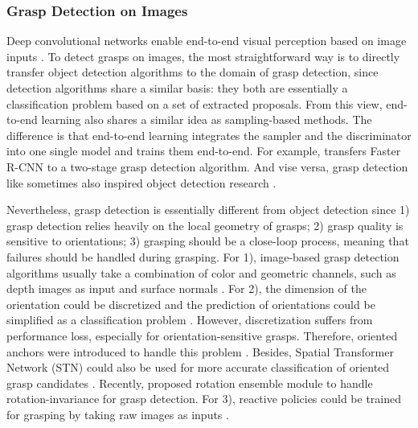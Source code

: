 \documentclass[letterpaper,10pt]{article}
\begin{document}
\subsubsection{Grasp Detection on Images}

Deep convolutional networks enable end-to-end visual perception based on image inputs \cite{krizhevsky2012imagenet, simonyan2014very, he2016deep}.
To detect grasps on images, the most straightforward way is to directly transfer object detection algorithms to the domain of grasp detection, since detection algorithms share a similar basis: they both are essentially a classification problem based on a set of extracted proposals.
From this view, end-to-end learning also shares a similar idea as sampling-based methods.
The difference is that end-to-end learning integrates the sampler and the discriminator into one single model and trains them end-to-end.
For example, \cite{guo2016deep, chu2018real} transfers Faster R-CNN \cite{ren2015faster} to a two-stage grasp detection algorithm.
And vise versa, grasp detection like \cite{redmon2015real} sometimes also inspired object detection research \cite{redmon2016you}.

Nevertheless, grasp detection is essentially different from object detection since 1) grasp detection relies heavily on the local geometry of grasps; 2) grasp quality is sensitive to orientations; 3) grasping should be a close-loop process, meaning that failures should be handled during grasping.
For 1), image-based grasp detection algorithms usually take a combination of color and geometric channels, such as depth images as input \cite{redmon2015real, kumra2017robotic, chu2018real, zhang2019real, song2020novel, wu2021real} and surface normals \cite{park2018classification}.
For 2), the dimension of the orientation could be discretized and the prediction of orientations could be simplified as a classification problem \cite{chu2018real, wu2021real}.
However, discretization suffers from performance loss, especially for orientation-sensitive grasps.
Therefore, oriented anchors were introduced to handle this problem \cite{zhou2018fully, zhang2019real}.
Besides, Spatial Transformer Network (STN) \cite{jaderberg2015spatial} could also be used for more accurate classification of oriented grasp candidates \cite{park2018classification, gariepy2019gq}.
Recently, \cite{park2020real} proposed rotation ensemble module to handle rotation-invariance for grasp detection.
For 3), reactive policies could be trained for grasping by taking raw images as inputs \cite{baier2007learning, lampe2013acquiring, mahler2017learning, levine2018learning, zeng2018learning}.
\end{document}
